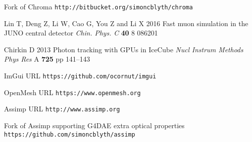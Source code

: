 \documentclass[a4paper]{jpconf}
\begin{document}
\begin{thebibliography}{9}
Fork of Chroma {\tt http://bitbucket.org/simoncblyth/chroma}

Lin T, Deng Z, Li W, Cao G, You Z and Li X
2016
Fast muon simulation in the JUNO central detector
{\it Chin. Phys. C} {\bf 40} 8 086201

Chirkin D
2013
Photon tracking with GPUs in IceCube
{\it Nucl Instrum Methods Phys Res} A {\bf 725} pp 141--143
%

ImGui URL {\tt https://github.com/ocornut/imgui}

OpenMesh URL {\tt https://www.openmesh.org}

Assimp URL {\tt http://www.assimp.org}

Fork of Assimp supporting G4DAE extra optical properties {\tt https://github.com/simoncblyth/assimp}

\end{thebibliography}
\end{document}
